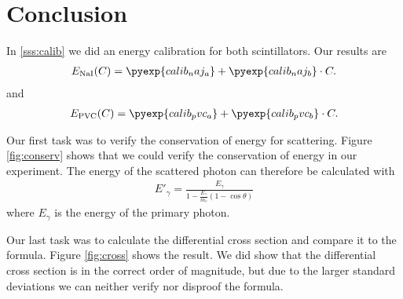 \section{Conclusion}

In \ref{sss:calib} we did an energy calibration for both scintillators. Our
results are
\begin{align}
  E_{\mathrm{NaI}}(C) = \pyexp{calib_naj_a} + \pyexp{calib_naj_b} \cdot C.
\end{align}
and
\begin{align}
  E_{\mathrm{PVC}}(C) = \pyexp{calib_pvc_a} + \pyexp{calib_pvc_b} \cdot C.
\end{align}

Our first task was to verify the conservation of energy for \compton
scattering. Figure \ref{fig:conserv} shows that we could verify the
conservation of energy in our experiment. The energy of the scattered photon
can therefore be calculated with
\begin{align}
  E'_\gamma = \frac{E_\gamma}{1 - \frac{E_\gamma}{m_e} (1-\cos \theta)}
\end{align}
where $E_\gamma$ is the energy of the primary photon.

Our last task was to calculate the differential cross section and compare it
to the \kleinn{} formula. Figure \ref{fig:cross} shows the result. We did
show that the differential cross section is in the correct order of
magnitude, but due to the larger standard deviations we can neither verify
nor disproof the \kleinn{} formula.

